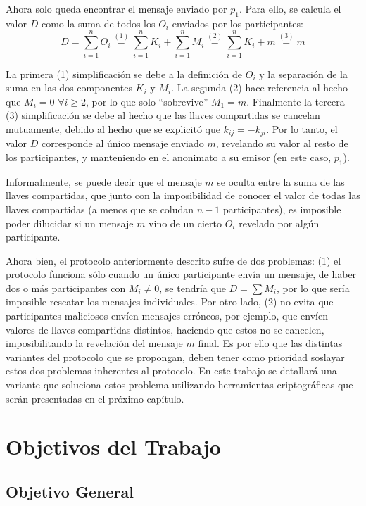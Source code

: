 Ahora solo queda encontrar el mensaje enviado por $p_1$. Para ello, se calcula el valor $D$ como la suma de todos los $O_i$ enviados por los 
participantes: $$D = \sum_{i=1}^n O_i \overset{(1)}{=} \sum_{i=1}^n K_i + \sum_{i=1}^n M_i \overset{(2)}{=} \sum_{i=1}^n K_i + m \overset{(3)}{=} m$$

La primera (1) simplificación se debe a la definición de $O_i$ y la separación de la suma en las dos componentes $K_i$ y $M_i$. La segunda 
(2) hace referencia al hecho que $M_i = 0$ $\forall i \geq 2$, por lo que solo ``sobrevive'' $M_1 = m$. Finalmente la tercera (3) simplificación 
se debe al hecho que las llaves compartidas se cancelan mutuamente, debido al hecho que se explicitó que $k_{ij} = -k_{ji}$. Por lo tanto, el 
valor $D$ corresponde al único mensaje enviado $m$, revelando su valor al resto de los participantes, y manteniendo en el anonimato a su emisor 
(en este caso, $p_1$).

Informalmente, se puede decir que el mensaje $m$ se oculta entre la suma de las llaves compartidas, que junto con la imposibilidad de conocer el 
valor de todas las llaves compartidas (a menos que se coludan $n-1$ participantes), es imposible poder dilucidar si un mensaje $m$ vino de un 
cierto $O_i$ revelado por algún participante.

Ahora bien, el protocolo anteriormente descrito sufre de dos problemas: (1) el protocolo funciona sólo cuando un 
único participante envía un mensaje, de haber dos o más participantes con $M_i \neq 0$, se tendría que $D = \sum M_i$, por lo que sería imposible 
rescatar los mensajes individuales. Por otro lado, (2) no evita que participantes maliciosos envíen mensajes erróneos, por ejemplo, que envíen 
valores de llaves compartidas distintos, haciendo que estos no se cancelen, imposibilitando la revelación del mensaje $m$ final. Es por ello que 
las distintas variantes del protocolo que se propongan, deben tener como prioridad soslayar estos dos problemas inherentes al protocolo. En este 
trabajo se detallará una variante que soluciona estos problema utilizando herramientas criptográficas que serán presentadas en el próximo capítulo.

\section{Objetivos del Trabajo}

\subsection{Objetivo General}

